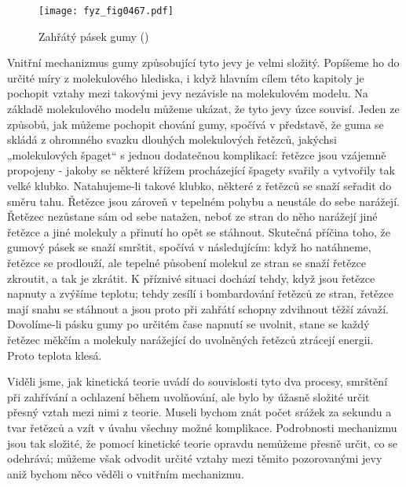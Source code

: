     \begin{figure}[ht!] %
      \centering
      \texttt{[image: fyz\_fig0467.pdf]}
      \caption{ Zahřátý pásek gumy (\cite[s.~596]{Feynman01})}
      \label{fyz:fig0467}
    \end{figure}

    Vnitřní mechanizmus gumy způsobující tyto jevy je velmi složitý. Popíšeme ho do určité míry z
    molekulového hlediska, i když hlavním cílem této kapitoly je pochopit vztahy mezi takovými jevy
    nezávisle na molekulovém modelu. Na základě molekulového modelu můžeme ukázat, že tyto jevy úzce
    souvisí. Jeden ze způsobů, jak můžeme pochopit chování gumy, spočívá v představě, že guma se
    skládá z ohromného svazku dlouhých molekulových řetězců, jakýchsi „molekulových špaget“ s
    jednou dodatečnou komplikací: řetězce jsou vzájemně propojeny - jakoby se některé křížem
    procházející špagety svařily a vytvořily tak velké klubko. Natahujeme-li takové klubko, některé
    z řetězců se snaží seřadit do směru tahu. Řetězce jsou zároveň v tepelném pohybu a neustále do
    sebe narážejí. Řetězec nezůstane sám od sebe natažen, neboť ze stran do něho narážejí jiné
    řetězce a jiné molekuly a přinutí ho opět se stáhnout. Skutečná příčina toho, že gumový pásek se
    snaží smrštit, spočívá v následujícím: když ho natáhneme, řetězce se prodlouží, ale tepelné
    působení molekul ze stran se snaží řetězce zkroutit, a tak je zkrátit. K příznivé situaci
    dochází tehdy, když jsou řetězce napnuty  a zvýšíme teplotu; tehdy zesílí i bombardování řetězců
    ze stran, řetězce mají snahu se stáhnout a jsou proto při zahřátí schopny zdvihnout těžší
    závaží. Dovolíme-li pásku gumy po určitém čase napnutí se uvolnit, stane se každý řetězec měkčím
    a molekuly narážející do uvolněných řetězců ztrácejí energii. Proto teplota klesá.

    Viděli jsme, jak kinetická teorie uvádí do souvislosti tyto dva procesy, smrštění při zahřívání
    a ochlazení během uvolňování, ale bylo by úžasně složité určit přesný vztah mezi nimi z teorie.
    Museli bychom znát počet srážek za sekundu a tvar řetězců a vzít v úvahu všechny možné
    komplikace. Podrobnosti mechanizmu jsou tak složité, že pomocí kinetické teorie opravdu
    nemůžeme přesně určit, co se odehrává; můžeme však odvodit určité vztahy mezi těmito
    pozorovanými jevy aniž bychom něco věděli o vnitřním mechanizmu.

